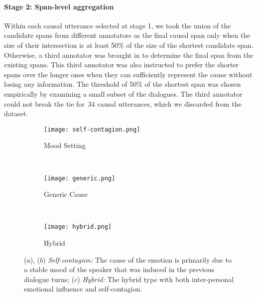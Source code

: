 \documentclass[smallextended]{svjour3}
\newcommand\0{\hphantom{0}}
\begin{document}
\paragraph{Stage 2: Span-level aggregation}
Within each causal utterance selected at 
stage 1,
we took the union of the candidate spans from different annotators as the final causal span only when the size of their intersection is at least 50\% of the size of the shortest candidate span. 
Otherwise,
a third annotator was brought in to determine the final span from the existing spans. This third annotator was also instructed to prefer the shorter spans over the longer ones when they can sufficiently represent the cause without losing any information. The threshold of 50\% of the shortest span was chosen empirically by examining a small subset of the dialogues.
The third annotator could not break the tie for~34 causal utterances, which we discarded from the dataset.





\begin{figure*}[t]
     \centering
     \begin{subfigure}[b]{60ex}
         \centering
         \texttt{[image: self-contagion.png]}
         \caption{Mood Setting}
         \label{fig:self-contagion}
     \end{subfigure}
\\[3ex]
     \begin{subfigure}[b]{60ex}
         \centering
         \texttt{[image: generic.png]}
         \caption{Generic Cause}
         \label{fig:generic_cause}
     \end{subfigure}
\\[3ex]
     \begin{subfigure}[b]{60ex}
         \centering
         \texttt{[image: hybrid.png]}
         \caption{Hybrid}
         \label{fig:hybrid}
     \end{subfigure}
     \caption{{($a$), ($b$) \textit{Self-contagion:} The cause of the emotion is primarily due to a stable mood of the speaker that was induced in the previous dialogue turns; ($c$) \textit{Hybrid:} The hybrid type 
with both
     inter-personal emotional influence and self-contagion.
}}
\end{figure*}
\end{document}
